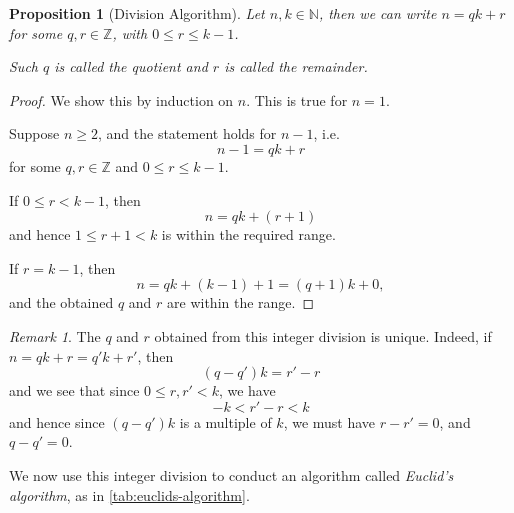 \documentclass{article}
\newtheorem{proposition}[theorem]{Proposition}
\theoremstyle{definition}
\theoremstyle{remark}
\newtheorem{remark}[theorem]{Remark}
\newcommand{\pqty}[1]{\left(#1\right)}
\newcommand{\NN}{\mathbb{N}}
\newcommand{\ZZ}{\mathbb{Z}}
\begin{document}
\begin{proposition}[Division Algorithm]
    Let \(n, k \in \NN\), then we can write \(n = qk + r\) for some \(q, r \in \ZZ\), with \(0 \leq r \leq k - 1\).
    
    Such \(q\) is called the \emph{quotient} and \(r\) is called the \emph{remainder}.
\end{proposition}

\begin{proof}
    We show this by induction on \(n\). This is true for \(n = 1\).

    Suppose \(n \geq 2\), and the statement holds for \(n - 1\), i.e.
    \[
        n - 1 = qk + r
    \]
    for some \(q, r \in \ZZ\) and \(0 \leq r \leq k - 1\).

    If \(0 \leq r < k - 1\), then
    \[
        n = qk + \pqty{r + 1}
    \]
    and hence \(1 \leq r + 1 < k\) is within the required range.

    If \(r = k - 1\), then
    \[
        n = qk + \pqty{k - 1} + 1 = \pqty{q + 1}k + 0,
    \]
    and the obtained \(q\) and \(r\) are within the range.
\end{proof}

\begin{remark}
    The \(q\) and \(r\) obtained from this integer division is unique. Indeed, if \(n = qk + r = q'k + r'\), then
    \[
        \pqty{q - q'}k = r' - r
    \]
    and we see that since \(0 \leq r, r' < k\), we have
    \[
        -k < r' - r < k
    \]
    and hence since \(\pqty{q - q'}k\) is a multiple of \(k\), we must have \(r - r' = 0\), and \(q - q' = 0\).
\end{remark}

We now use this integer division to conduct an algorithm called \emph{Euclid's algorithm}, as in \autoref{tab:euclids-algorithm}.
\end{document}
